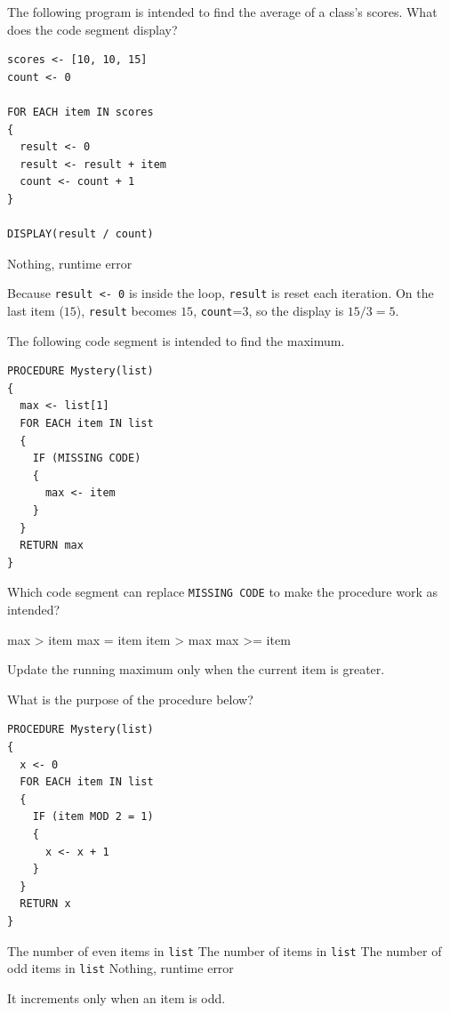 \newpage

\question[5]
The following program is intended to find the average of a class's scores. What does the code segment display?
\begin{lstlisting}[style=pseudo]
scores <- [10, 10, 15]
count <- 0

FOR EACH item IN scores
{
  result <- 0
  result <- result + item
  count <- count + 1
}

DISPLAY(result / count)
\end{lstlisting}
\begin{choices}
  \choice Nothing, runtime error
\end{choices}
\begin{solution}
  Because \texttt{result <- 0} is inside the loop, \texttt{result} is reset each iteration. On the last item (\(15\)), \texttt{result} becomes \(15\), \texttt{count}=3, so the display is \(15/3 = 5\).
\end{solution}

\question[5]
The following code segment is intended to find the maximum.
\begin{lstlisting}[style=pseudo]
PROCEDURE Mystery(list)
{
  max <- list[1]
  FOR EACH item IN list
  {
    IF (MISSING CODE)
    {
      max <- item
    }
  }
  RETURN max
}
\end{lstlisting}
Which code segment can replace \texttt{MISSING CODE} to make the procedure work as intended?
\begin{choices}
  \choice max > item
  \choice max = item
  \CorrectChoice item > max
  \choice max >= item
\end{choices}
\begin{solution}
  Update the running maximum only when the current item is greater.
\end{solution}


\newpage


\question[5]
What is the purpose of the procedure below?
\begin{lstlisting}[style=pseudo]
PROCEDURE Mystery(list)
{
  x <- 0
  FOR EACH item IN list
  {
    IF (item MOD 2 = 1)
    {
      x <- x + 1
    }
  }
  RETURN x
}
\end{lstlisting}
\begin{choices}
  \choice The number of even items in \texttt{list}
  \choice The number of items in \texttt{list}
  \CorrectChoice The number of odd items in \texttt{list}
  \choice Nothing, runtime error
\end{choices}
\begin{solution}
  It increments only when an item is odd.
\end{solution}


